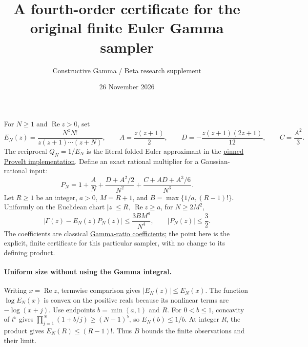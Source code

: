 \documentclass[11pt]{article}
\title{\vspace{-1.6em}A fourth-order certificate for the\\ original finite Euler Gamma sampler}
\author{Constructive Gamma / Beta research supplement}
\date{26 November 2026}
\begin{document}
\maketitle

For \(N\ge1\) and \(\operatorname{Re}z>0\), set
\[
 E_N(z)=\frac{N^z N!}{z(z+1)\cdots(z+N)},\qquad
 A=\frac{z(z+1)}2,\qquad
 D=-\frac{z(z+1)(2z+1)}{12},\qquad C=\frac{A^2}{3}.
\]
The reciprocal \(Q_N=1/E_N\) is the literal folded Euler approximant
in the \href{https://github.com/VladimirReshetnikov/ProveIt/blob/3539ad1a8960af7f812b826057c3409eccaa3c49/Logic/PrimitiveRecursiveArithmetic/Derivations/Lean/IPRADerivations/Analysis/GaussianGammaFiniteApproximantName.lean}{pinned ProveIt implementation}. Define an exact rational multiplier
for a Gaussian-rational input:
\[
 P_N=1+\frac{A}{N}+\frac{D+A^2/2}{N^2}
             +\frac{C+AD+A^3/6}{N^3}.
\]
Let \(R\ge1\) be an integer, \(a>0\), \(M=R+1\), and
\(B=\max\{1/a,(R-1)!\}\). Uniformly on the Euclidean chart
\(|z|\le R,\ \operatorname{Re}z\ge a\), for \(N\ge2M^2\),
\begin{equation}
 |\Gamma(z)-E_N(z)P_N(z)|\le \frac{3BM^8}{N^4},
 \qquad |P_N(z)|\le\frac32. \label{thm}
\end{equation}
The coefficients are classical
\href{https://dlmf.nist.gov/5.11#iii}{Gamma-ratio coefficients};
the point here is the explicit, finite certificate for this particular
sampler, with no change to its defining product.

\paragraph{Uniform size without using the Gamma integral.}
Writing \(x=\operatorname{Re}z\), termwise comparison gives
\(|E_N(z)|\le E_N(x)\). The function \(\log E_N(x)\) is convex on
the positive reals because its nonlinear terms are \(-\log(x+j)\).
Use endpoints \(b=\min(a,1)\) and \(R\). For \(0<b\le1\),
concavity of \(t^b\) gives
\(\prod_{j=1}^N(1+b/j)\ge (N+1)^b\), so \(E_N(b)\le 1/b\).
At integer \(R\), the product gives \(E_N(R)\le (R-1)!\).
Thus \(B\) bounds the finite observations and their limit.
\end{document}
